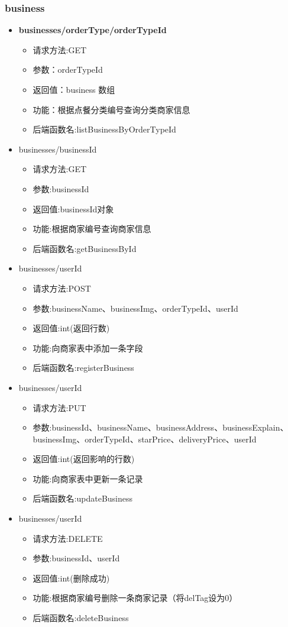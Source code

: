 \subsubsection*{business}
\begin{itemize}
    \item \textbf{ businesses/orderType/{orderTypeId}}
    \begin{itemize}
    \item 请求方法:GET
    \item 参数：orderTypeId
    \item 返回值：business 数组
    \item 功能：根据点餐分类编号查询分类商家信息
    \item 后端函数名:listBusinessByOrderTypeId
    \end{itemize}
    \item businesses/{businessId}
    \begin{itemize}
    \item 请求方法:GET
    \item 参数:businessId
    \item 返回值:businessId对象
    \item 功能:根据商家编号查询商家信息
    \item 后端函数名:getBusinessById
    \end{itemize}
    \item businesses/{userId}
    \begin{itemize}
    \item 请求方法:POST
    \item 参数:businessName、businessImg、orderTypeId、userId
    \item 返回值:int(返回行数)
    \item 功能:向商家表中添加一条字段
    \item 后端函数名:registerBusiness
    \end{itemize}
    \item businesses/{userId}
    \begin{itemize}
    \item 请求方法:PUT
    \item 参数:businessId、businessName、businessAddress、businessExplain、businessImg、orderTypeId、starPrice、deliveryPrice、userId
    \item 返回值:int(返回影响的行数)
    \item 功能:向商家表中更新一条记录
    \item 后端函数名:updateBusiness
    \end{itemize}
    \item businesses/{userId}
    \begin{itemize}
    \item 请求方法:DELETE
    \item 参数:businessId、userId
    \item 返回值:int(删除成功)
    \item 功能:根据商家编号删除一条商家记录（将delTag设为0）
    \item 后端函数名:deleteBusiness
    \end{itemize}
\end{itemize}

